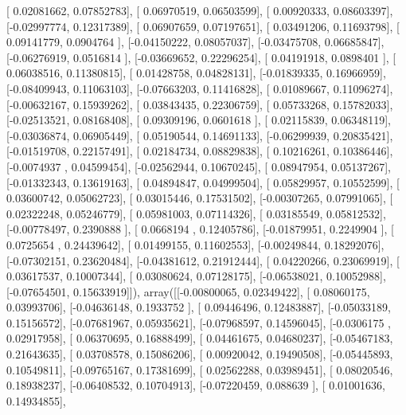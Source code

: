 \documentclass{article}
\begin{document}
       [ 0.02081662,  0.07852783],
       [ 0.06970519,  0.06503599],
       [ 0.00920333,  0.08603397],
       [-0.02997774,  0.12317389],
       [ 0.06907659,  0.07197651],
       [ 0.03491206,  0.11693798],
       [ 0.09141779,  0.0904764 ],
       [-0.04150222,  0.08057037],
       [-0.03475708,  0.06685847],
       [-0.06276919,  0.0516814 ],
       [-0.03669652,  0.22296254],
       [ 0.04191918,  0.0898401 ],
       [ 0.06038516,  0.11380815],
       [ 0.01428758,  0.04828131],
       [-0.01839335,  0.16966959],
       [-0.08409943,  0.11063103],
       [-0.07663203,  0.11416828],
       [ 0.01089667,  0.11096274],
       [-0.00632167,  0.15939262],
       [ 0.03843435,  0.22306759],
       [ 0.05733268,  0.15782033],
       [-0.02513521,  0.08168408],
       [ 0.09309196,  0.0601618 ],
       [ 0.02115839,  0.06348119],
       [-0.03036874,  0.06905449],
       [ 0.05190544,  0.14691133],
       [-0.06299939,  0.20835421],
       [-0.01519708,  0.22157491],
       [ 0.02184734,  0.08829838],
       [ 0.10216261,  0.10386446],
       [-0.0074937 ,  0.04599454],
       [-0.02562944,  0.10670245],
       [ 0.08947954,  0.05137267],
       [-0.01332343,  0.13619163],
       [ 0.04894847,  0.04999504],
       [ 0.05829957,  0.10552599],
       [ 0.03600742,  0.05062723],
       [ 0.03015446,  0.17531502],
       [-0.00307265,  0.07991065],
       [ 0.02322248,  0.05246779],
       [ 0.05981003,  0.07114326],
       [ 0.03185549,  0.05812532],
       [-0.00778497,  0.2390888 ],
       [ 0.0668194 ,  0.12405786],
       [-0.01879951,  0.2249904 ],
       [ 0.0725654 ,  0.24439642],
       [ 0.01499155,  0.11602553],
       [-0.00249844,  0.18292076],
       [-0.07302151,  0.23620484],
       [-0.04381612,  0.21912444],
       [ 0.04220266,  0.23069919],
       [ 0.03617537,  0.10007344],
       [ 0.03080624,  0.07128175],
       [-0.06538021,  0.10052988],
       [-0.07654501,  0.15633919]]), array([[-0.00800065,  0.02349422],
       [ 0.08060175,  0.03993706],
       [-0.04636148,  0.1933752 ],
       [ 0.09446496,  0.12483887],
       [-0.05033189,  0.15156572],
       [-0.07681967,  0.05935621],
       [-0.07968597,  0.14596045],
       [-0.0306175 ,  0.02917958],
       [ 0.06370695,  0.16888499],
       [ 0.04461675,  0.04680237],
       [-0.05467183,  0.21643635],
       [ 0.03708578,  0.15086206],
       [ 0.00920042,  0.19490508],
       [-0.05445893,  0.10549811],
       [-0.09765167,  0.17381699],
       [ 0.02562288,  0.03989451],
       [ 0.08020546,  0.18938237],
       [-0.06408532,  0.10704913],
       [-0.07220459,  0.088639  ],
       [ 0.01001636,  0.14934855],
\end{document}
